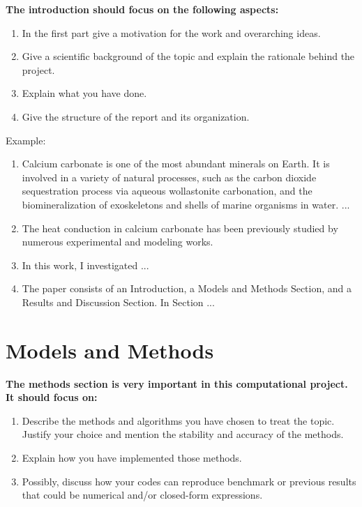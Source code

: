 \documentclass[aip,reprint]{revtex4-1}
\begin{document}
\textbf{The introduction should focus on the following aspects:}
\begin{enumerate}
    \item In the first part give a motivation for the work and overarching ideas.
    \item Give a scientific background of the topic and explain the rationale behind the project.
    \item Explain what you have done.
    \item Give the structure of the report and its organization.
\end{enumerate}
Example:
\begin{enumerate}
    \item Calcium carbonate is one of the most abundant minerals on Earth.\cite{deer2013introduction} It is involved in a variety of natural processes, such as the carbon dioxide sequestration process via aqueous wollastonite carbonation, \cite{Wouter_wollastonite, CO2_seqestation} and the biomineralization of exoskeletons and shells of marine organisms in water.\cite{Biomin_mollusc} ...
    \item The heat conduction in calcium carbonate has been previously studied by numerous experimental and modeling works. \cite{Bayarjargal_phase_diagr_VII} 
    \item In this work, I investigated ...
    \item The paper consists of an Introduction, a Models and Methods Section, and a Results and Discussion Section. In Section ...
\end{enumerate}

\section{Models and Methods}\label{sec:method}
\textbf{The methods section is very important in this computational project. It should focus on:}
\begin{enumerate}
    \item Describe the methods and algorithms you have chosen to treat the topic. Justify your choice and mention the stability and accuracy of the methods.
    \item Explain how you have implemented those methods.
    \item Possibly, discuss how your codes can reproduce benchmark or previous results that could be numerical and/or closed-form expressions.
\end{enumerate}
\end{document}
